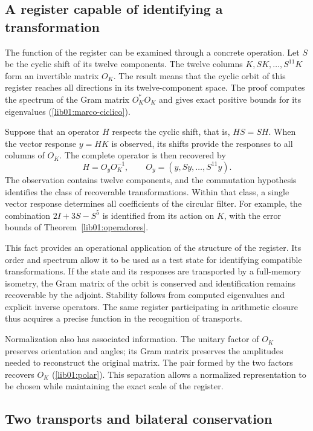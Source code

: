 \subsection*{A register capable of identifying a transformation}
\label{libnar:identificacion}

The function of the register can be examined through a concrete
operation. Let \(S\) be the cyclic shift of its twelve
components. The twelve columns
\(K,SK,\ldots,S^{11}K\) form an invertible matrix \(O_K\).
The result means that the cyclic orbit of this register reaches
all directions in its twelve-component space. The proof
computes the spectrum of the Gram matrix \(O_K^*O_K\) and gives exact
positive bounds for its eigenvalues (\cref{lib01:marco-ciclico}).

Suppose that an operator \(H\) respects the cyclic shift,
that is, \(HS=SH\). When the vector response \(y=HK\) is observed,
its shifts provide the responses to all columns
of \(O_K\). The complete operator is then recovered by
\[
 H=O_yO_K^{-1},\qquad
 O_y=(y,Sy,\ldots,S^{11}y).
\]
The observation contains twelve components, and the commutation
hypothesis identifies the class of recoverable transformations.
Within that class, a single vector response determines all
coefficients of the circular filter. For example, the combination
\(2I+3S-S^5\) is identified from its action on \(K\),
with the error bounds of Theorem~\ref{lib01:operadores}.

This fact provides an operational application of the structure of the
register. Its order and spectrum allow it to be used as a test
state for identifying compatible transformations. If the state
and its responses are transported by a full-memory isometry,
the Gram matrix of the orbit is conserved and identification remains
recoverable by the adjoint. Stability follows from computed
eigenvalues and explicit inverse operators. The same
register participating in arithmetic closure thus acquires a
precise function in the recognition of transports.

Normalization also has associated information. The
unitary factor of \(O_K\) preserves orientation and angles; its Gram matrix
preserves the amplitudes needed to reconstruct the original
matrix. The pair formed by the two factors recovers \(O_K\)
(\cref{lib01:polar}). This separation allows a normalized
representation to be chosen while maintaining the exact
scale of the register.

\subsection*{Two transports and bilateral conservation}
\label{libnar:bilateral}

